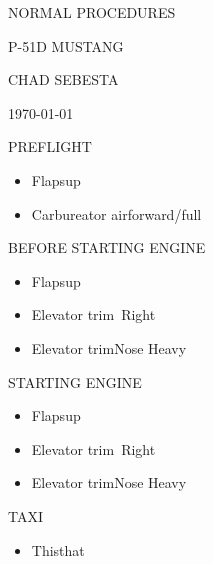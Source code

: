 \documentclass[11pt,letterpaper,twocolumn]{article}
\newcommand*{\aircraft}{p-51d mustang} %
\newcommand*{\doctitle}{normal procedures} %
\newcommand*{\protitle}[1]{{\Large\sf#1}} %
\newcommand*{\proitem}[2]{\item#1\dotfill#2} %
\newenvironment*{prolist}[1]
	{
	\begin{center}
	\protitle{#1}
	\begin{itemize}[noitemsep]
	}
	{
	\end{itemize}
	\end{center}
	}
\begin{document}

\begin{titlepage}

	\sf

	\centering

	{\Huge\MakeUppercase{\doctitle}}

	\vspace{0.1in}

	{\Huge\MakeUppercase{\aircraft}}

	\vspace{1in}

	\MakeUppercase{Chad Sebesta}

	\MakeUppercase{\today}

	\thispagestyle{empty} %

\end{titlepage}


	\begin{prolist}{PREFLIGHT}
		\proitem{Flaps}{up}
		\proitem{Carbureator air}{forward/full}
	\end{prolist}

	\begin{prolist}{BEFORE STARTING ENGINE}
		\proitem{Flaps}{up}
		\proitem{Elevator trim}{5\textdegree\ Right}
		\proitem{Elevator trim}{Nose Heavy}
	\end{prolist}

	\newpage

	\begin{prolist}{STARTING ENGINE}
		\proitem{Flaps}{up}
		\proitem{Elevator trim}{5\textdegree\ Right}
		\proitem{Elevator trim}{Nose Heavy}
	\end{prolist}

	\begin{prolist}{TAXI}
		\proitem{This}{that}
	\end{prolist}
\end{document}
